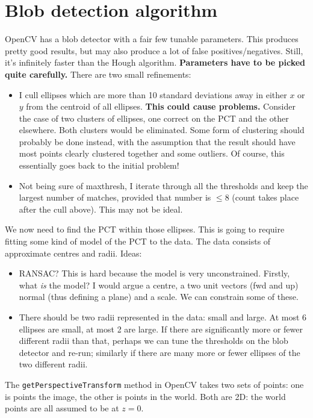 \section{Blob detection algorithm}
OpenCV has a blob detector with a fair few tunable parameters. This produces pretty good results,
but may also produce a lot of false positives/negatives. Still, it's infinitely faster than the
Hough algorithm. \textbf{Parameters have to be picked quite carefully.} There are two small refinements:
\begin{itemize}
\item I cull ellipses which are more than 10 standard deviations away in either $x$ or $y$ from
the centroid of all ellipses. \textbf{This could cause problems.} Consider
the case of two clusters of ellipses, one correct on the PCT and the other
elsewhere. Both clusters would be eliminated. Some form of clustering
should probably be done instead, with the assumption that the result
should have most points clearly clustered together and some outliers. Of
course, this essentially goes back to the initial problem!
\item Not being sure of maxthresh, I iterate through all the thresholds and keep the largest number of
matches, provided that number is $\le 8$ (count takes place after the cull above). This may not be ideal.
\end{itemize}


We now need to find the PCT within those ellipses. This is going to require fitting some kind of
model of the PCT to the data. The data consists of approximate centres and radii. 
Ideas:
\begin{itemize}
\item RANSAC? This is hard because the model is very unconstrained. Firstly, what \emph{is} the
model? I would argue a centre, a two unit vectors (fwd and up) normal (thus defining a plane) and a scale.
We can constrain some of these.
\item There should be two radii represented in the data: small and large. At most 6 ellipses are small, at most
2 are large. If there are significantly more or fewer different radii than that, perhaps we can tune the thresholds on the blob
detector and re-run; similarly if there are many more or fewer ellipses of the two different radii.
\end{itemize}
The \verb+getPerspectiveTransform+ method in OpenCV takes two sets of 
points: one is points the image, the other is points in the world. Both are 2D: the world points
are all assumed to be at $z=0$. 
